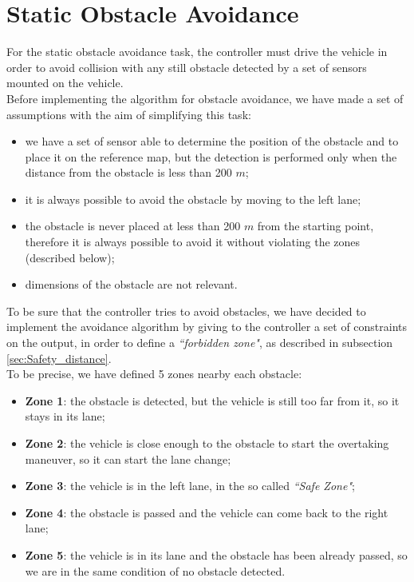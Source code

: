 \section{Static Obstacle Avoidance}
\label{chap:StaticObstacleAvoidance}
For the static obstacle avoidance task, the controller must drive the vehicle in order to avoid collision with any still obstacle detected by a set of sensors mounted on the vehicle.\\
Before implementing the algorithm for obstacle avoidance, we have made a set of assumptions with the aim of simplifying this task:
\begin{itemize}
    \item we have a set of sensor able to determine the position of the obstacle and to place it on the reference map, but the detection is performed only when the distance from the obstacle is less than 200 $m$;
    \item it is always possible to avoid the obstacle by moving to the left lane;
    \item the obstacle is never placed at less than 200 $m$ from the starting point, therefore it is always possible to avoid it without violating the zones (described below); 
    \item dimensions of the obstacle are not relevant.
\end{itemize}
To be sure that the controller tries to avoid obstacles, we have decided to implement the avoidance algorithm by giving to the controller a set of constraints on the output, in order to define a \textit{``forbidden zone"}, as described in subsection \ref{sec:Safety_distance}.\\
To be precise, we have defined 5 zones nearby each obstacle:
\begin{itemize}
    \item \textbf{Zone 1}: the obstacle is detected, but the vehicle is still too far from it, so it stays in its lane;
    \item \textbf{Zone 2}: the vehicle is close enough to the obstacle to start the overtaking maneuver, so it can start the lane change;
    \item \textbf{Zone 3}: the vehicle is in the left lane, in the so called \textit{``Safe Zone"};
    \item \textbf{Zone 4}: the obstacle is passed and the vehicle can come back to the right lane;
    \item \textbf{Zone 5}: the vehicle is in its lane and the obstacle has been already passed, so we are in the same condition of no obstacle detected.
\end{itemize}
